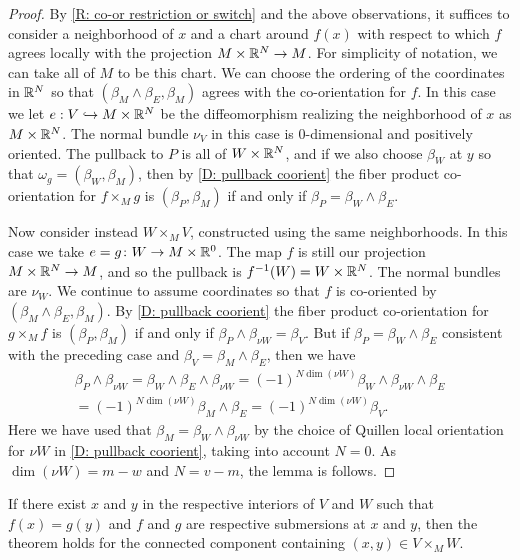 \begin{proof}
	By \cref{R: co-or restriction or switch} and the above observations, it suffices to consider a neighborhood of $x$ and a chart around $f(x)$ with respect to which $f$ agrees locally with the projection $M\times \mathbb{R}^N\to M$.
	For simplicity of notation, we can take all of $M$ to be this chart.
	We can choose the ordering of the coordinates in $\mathbb{R}^N$ so that $(\beta_M\wedge \beta_E,\beta_M)$ agrees with the co-orientation for $f$.
	In this case we let $e:V\hookrightarrow M\times \mathbb{R}^N$ be the diffeomorphism realizing the neighborhood of $x$ as $M\times \mathbb{R}^N$.
	The normal bundle $\nu_V$ in this case is $0$-dimensional and positively oriented.
	The pullback to $P$ is all of $W\times \mathbb{R}^N$, and if we also choose $\beta_W$ at $y$ so that $\omega_g=(\beta_W,\beta_M)$, then by \cref{D: pullback coorient} the fiber product co-orientation for $f\times_Mg$ is $(\beta_P,\beta_M)$ if and only if $\beta_P=\beta_W\wedge \beta_E$.

	Now consider instead $W\times_MV$, constructed using the same neighborhoods.
	In this case we take $e=g \colon W \to M\times \mathbb{R}^0$.
	The map $f$ is still our projection $M\times \mathbb{R}^N\to M$, and so the pullback is $f^{-1}(W)=W\times \mathbb{R}^N$.
	The normal bundles are $\nu_W$.
	We continue to assume coordinates so that $f$ is co-oriented by $(\beta_M\wedge \beta_E, \beta_M)$.
	By \cref{D: pullback coorient} the fiber product co-orientation for $g\times_Mf$ is $(\beta_P,\beta_M)$ if and only if $\beta_P\wedge \beta_{\nu W} =\beta_V$.
	But if $\beta_P=\beta_W\wedge \beta_E$ consistent with the preceding case and $\beta_V=\beta_M\wedge \beta_E$, then we have
	\begin{multline*}\beta_P\wedge \beta_{\nu W}=\beta_W\wedge \beta_E\wedge \beta_{\nu W}=(-1)^{N\dim(\nu W)}\beta_W\wedge \beta_{\nu W}\wedge \beta_E\\=(-1)^{N\dim(\nu W)}\beta_M\wedge \beta_E=(-1)^{N\dim(\nu W)}\beta_V.\end{multline*}
	Here we have used that $\beta_M=\beta_W\wedge \beta_{\nu W}$ by the choice of Quillen local orientation for $\nu W$ in \cref{D: pullback coorient}, taking into account $N=0$.
	As $\dim(\nu W)=m-w$ and $N=v-m$, the lemma is follows.
\end{proof}

\begin{lemma}\label{L: sub/sub}
	If there exist $x$ and $y$ in the respective interiors of $V$ and $W$ such that $f(x)=g(y)$ and $f$ and $g$ are respective submersions at $x$ and $y$, then the theorem holds for the connected component containing $(x,y)\in V\times_MW$.
\end{lemma}

